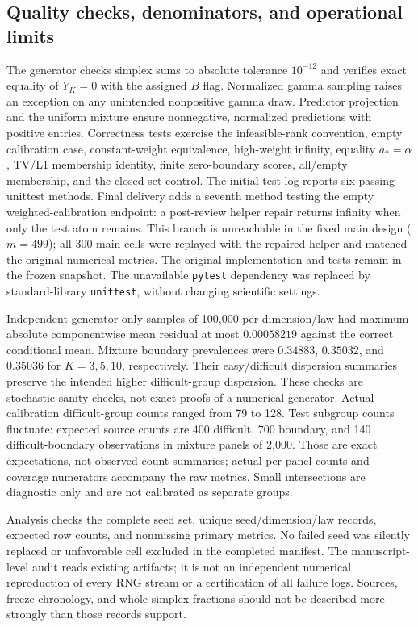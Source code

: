 \documentclass{article}
\theoremstyle{plain}
\begin{document}
\subsection{Quality checks, denominators, and operational limits}
The generator checks simplex sums to absolute tolerance $10^{-12}$ and verifies exact equality of $Y_K=0$ with the assigned $B$ flag. Normalized gamma sampling raises an exception on any unintended nonpositive gamma draw. Predictor projection and the uniform mixture ensure nonnegative, normalized predictions with positive entries. Correctness tests exercise the infeasible-rank convention, empty calibration case, constant-weight equivalence, high-weight infinity, equality $a_*=\alpha$, TV/L1 membership identity, finite zero-boundary scores, all/empty membership, and the closed-set control. The initial test log reports six passing unittest methods. Final delivery adds a seventh method testing the empty weighted-calibration endpoint: a post-review helper repair returns infinity when only the test atom remains. This branch is unreachable in the fixed main design ($m=499$); all 300 main cells were replayed with the repaired helper and matched the original numerical metrics. The original implementation and tests remain in the frozen snapshot. The unavailable \texttt{pytest} dependency was replaced by standard-library \texttt{unittest}, without changing scientific settings.

Independent generator-only samples of 100,000 per dimension/law had maximum absolute componentwise mean residual at most $0.00058219$ against the correct conditional mean. Mixture boundary prevalences were $0.34883$, $0.35032$, and $0.35036$ for $K=3,5,10$, respectively. Their easy/difficult dispersion summaries preserve the intended higher difficult-group dispersion. These checks are stochastic sanity checks, not exact proofs of a numerical generator. Actual calibration difficult-group counts ranged from 79 to 128. Test subgroup counts fluctuate: expected source counts are 400 difficult, 700 boundary, and 140 difficult-boundary observations in mixture panels of 2,000. Those are exact expectations, not observed count summaries; actual per-panel counts and coverage numerators accompany the raw metrics. Small intersections are diagnostic only and are not calibrated as separate groups.

Analysis checks the complete seed set, unique seed/dimension/law records, expected row counts, and nonmissing primary metrics. No failed seed was silently replaced or unfavorable cell excluded in the completed manifest. The manuscript-level audit reads existing artifacts; it is not an independent numerical reproduction of every RNG stream or a certification of all failure logs. Sources, freeze chronology, and whole-simplex fractions should not be described more strongly than those records support.
\end{document}
